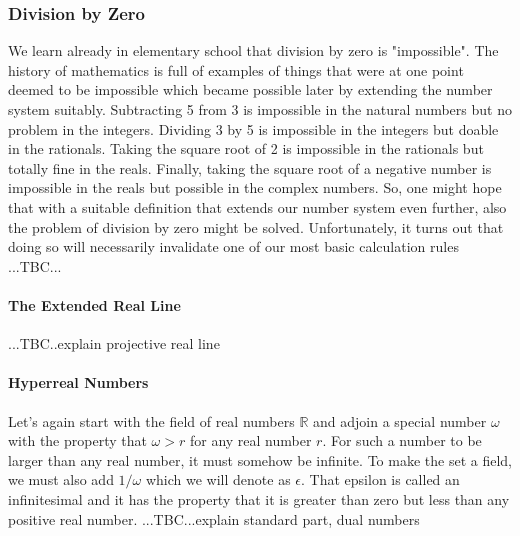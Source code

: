 


\subsubsection{Division by Zero}
We learn already in elementary school that division by zero is "impossible". The history of mathematics is full of examples of things that were at one point deemed to be impossible which became possible later by extending the number system suitably. Subtracting 5 from 3 is impossible in the natural numbers but no problem in the integers. Dividing 3 by 5 is impossible in the integers but doable in the rationals. Taking the square root of 2 is impossible in the rationals but totally fine in the reals. Finally, taking the square root of a negative number is impossible in the reals but possible in the complex numbers. So, one might hope that with a suitable definition that extends our number system even further, also the problem of division by zero might be solved. Unfortunately, it turns out that doing so will necessarily invalidate one of our most basic calculation rules ...TBC...

\paragraph{The Extended Real Line}...TBC..explain projective real line 




\paragraph{Hyperreal Numbers} Let's again start with the field of real numbers $\mathbb{R}$ and adjoin a special number $\omega$ with the property that $\omega > r$ for any real number $r$. For such a number to be larger than any real number, it must somehow be infinite. To make the set a field, we must also add $1/\omega$ which we will denote as $\epsilon$. That epsilon is called an infinitesimal and it has the property that it is greater than zero but less than any positive real number.  ...TBC...explain standard part, dual numbers

